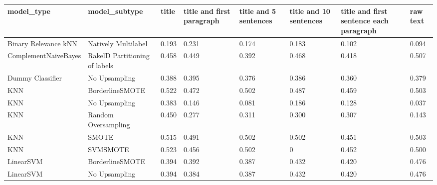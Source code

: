 \begin{tabular}{llllllll}
\toprule
                     model\_type &                 model\_subtype & title & title and first paragraph & title and 5 sentences & title and 10 sentences & title and first sentence each paragraph &  raw text \\
\midrule
           Binary Relevance kNN &           Natively Multilabel & 0.193 &                     0.231 &                 0.174 &                  0.183 &                                   0.102 &     0.094 \\
           ComplementNaiveBayes & RakelD Partitioning of labels & 0.458 &                     0.449 &                 0.392 &                  0.468 &                                   0.418 &     0.507 \\
               Dummy Classifier &                 No Upsampling & 0.388 &                     0.395 &                 0.376 &                  0.386 &                                   0.360 &     0.379 \\
                            KNN &               BorderlineSMOTE & 0.522 &                     0.472 &                 0.502 &                  0.487 &                                   0.459 &     0.503 \\
                            KNN &                 No Upsampling & 0.383 &                     0.146 &                 0.081 &                  0.186 &                                   0.128 &     0.037 \\
                            KNN &           Random Oversampling & 0.450 &                     0.277 &                 0.311 &                  0.300 &                                   0.307 &     0.143 \\
                            KNN &                         SMOTE & 0.515 &                     0.491 &                 0.502 &                  0.502 &                                   0.451 &     0.503 \\
                            KNN &                      SVMSMOTE & 0.523 &                     0.456 &                 0.502 &                      0 &                                   0.452 &     0.500 \\
                      LinearSVM &               BorderlineSMOTE & 0.394 &                     0.392 &                 0.387 &                  0.432 &                                   0.420 &     0.476 \\
                      LinearSVM &                 No Upsampling & 0.394 &                     0.384 &                 0.387 &                  0.432 &                                   0.420 &     0.476 \\

\end{tabular}
